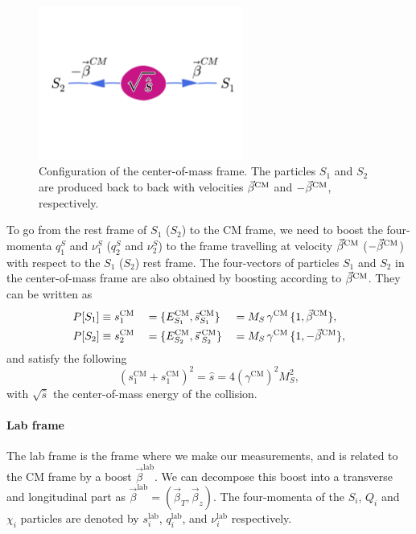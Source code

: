 \begin{figure}[htpb]
  \centering
  \includegraphics[width=0.6\textwidth,clip=true,trim=0 5.5cm 0
4.5cm]{figures/razor_variables/cm_frame} 
  \caption{Configuration of the center-of-mass frame. The particles $S_1$ and $S_2$ are
produced back to back with velocities $\vec{\beta}^{\textrm{CM}}$ and $-\vec{\beta}^{\textrm{CM}}$, respectively. 
\label{fig:razor_CM_frame}}
\end{figure}

To go from the rest frame of $S_1$ ($S_2$) to the CM frame, we need to boost the four-momenta
$q_1^S$ and $\nu_1^S$ ($q_2^S$ and $\nu_2^S$) to the frame travelling at velocity $\vec{\beta}^{\textrm{CM}}$
($-\vec{\beta}^{\textrm{CM}}$) with respect to the $S_1$ ($S_2$) rest frame. 
The four-vectors of particles $S_1$ and $S_2$ in the center-of-mass frame are also obtained by
boosting according to $\vec{\beta}^{\textrm{CM}}$. They can be written as
\begin{alignat}{6}
  P[S_1] &\equiv s^{\textrm{CM}}_1  &&= \{ E^{\textrm{CM}}_{S_1} , \vec{s}^{\textrm{CM}}_{S_1}\} 
&&= M_S \, \gamma^{\textrm{CM}} \, \{ 1 , \vec{\beta}^{\textrm{CM}}\} , \\ 
  P[S_2] &\equiv s^{\textrm{CM}}_2 &&= \{ E^{\textrm{CM}}_{S_2} , \vec{s}\,^{\textrm{CM}}_{S_2}\}
&&= M_S \, \gamma^{\textrm{CM}} \, \{ 1 , -\vec{\beta}^{\textrm{CM}}\},  
\end{alignat}
and satisfy the following
\begin{equation}
  (s^{\textrm{CM}}_1 + s^{\textrm{CM}}_1)^2 = \hat{s} = 4 (\gamma^{\textrm{CM}})^2 M_S^2,
\end{equation}
with $\sqrt{\hat{s}}$ the center-of-mass energy of the collision. 


\paragraph{Lab frame}
The lab frame is the frame where we make our measurements, and is related to the CM frame by a
boost $\vec{\beta}^{\textrm{lab}}$. We can decompose this boost into a transverse and longitudinal
part as $\vec{\beta}^{\textrm{lab}} = (\vec{\beta}_T,\vec{\beta}_z)$. 
The four-momenta of the $S_i$, $Q_i$ and $\chi_i$ particles are denoted by $s^{\textrm{lab}}_i$,
$q^{\textrm{lab}}_i$, and $\nu^{\textrm{lab}}_i$ respectively. 



